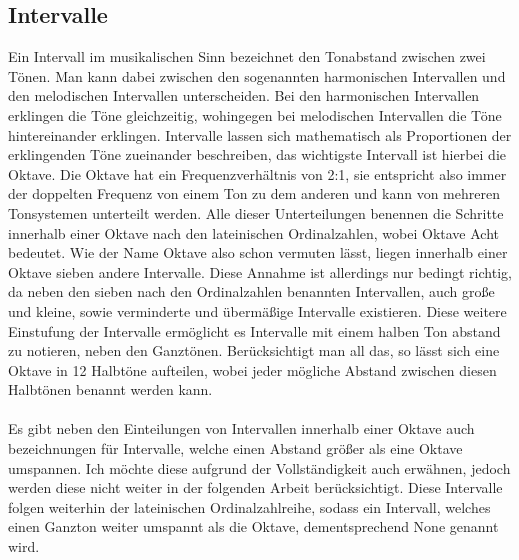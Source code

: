 \subsection*{Intervalle}
\label{sec:Intervalle}
Ein Intervall im musikalischen Sinn bezeichnet den Tonabstand zwischen zwei Tönen. Man kann dabei zwischen den sogenannten harmonischen Intervallen und den melodischen Intervallen unterscheiden. Bei den harmonischen Intervallen erklingen die Töne
gleichzeitig, wohingegen bei melodischen Intervallen die Töne hintereinander erklingen. Intervalle lassen sich mathematisch als Proportionen der erklingenden Töne zueinander beschreiben, das wichtigste Intervall ist hierbei die Oktave. Die Oktave hat ein Frequenzverhältnis von 2:1, 
sie entspricht also immer der doppelten Frequenz von einem Ton zu dem anderen und kann von mehreren Tonsystemen unterteilt werden. Alle dieser Unterteilungen benennen die Schritte innerhalb einer 
Oktave nach den lateinischen Ordinalzahlen, wobei Oktave Acht bedeutet. Wie der Name Oktave also schon vermuten lässt, liegen innerhalb einer Oktave sieben andere Intervalle. Diese Annahme ist allerdings nur bedingt richtig, da neben den sieben nach den Ordinalzahlen benannten Intervallen, auch 
große und kleine, sowie verminderte und übermäßige Intervalle existieren. Diese weitere Einstufung der Intervalle ermöglicht es Intervalle mit einem halben Ton abstand zu notieren, neben den Ganztönen. Berücksichtigt man all das, so lässt sich eine Oktave in 
12 Halbtöne aufteilen, wobei jeder mögliche Abstand zwischen diesen Halbtönen benannt werden kann. \\\\
Es gibt neben den Einteilungen von Intervallen innerhalb einer Oktave auch bezeichnungen für Intervalle, welche einen Abstand größer als eine Oktave umspannen. Ich möchte diese aufgrund der Vollständigkeit auch erwähnen, jedoch werden diese nicht weiter in der folgenden Arbeit berücksichtigt.
Diese Intervalle folgen weiterhin der lateinischen Ordinalzahlreihe, sodass ein Intervall, welches einen Ganzton weiter umspannt als die Oktave, dementsprechend None genannt wird. \cite{abcmusik}

